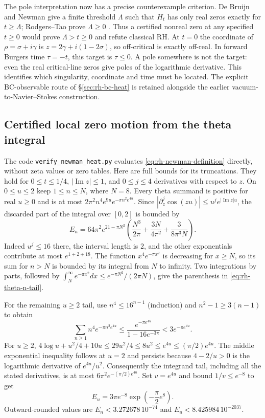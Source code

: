 The pole interpretation now has a precise counterexample criterion.
De Bruijn and Newman give a finite threshold $\Lambda$ such that
$H_t$ has only real zeros exactly for $t\ge\Lambda$;
Rodgers--Tao prove $\Lambda\ge0$
\cite[\S1]{rodgersTao2020}. Thus a certified nonreal zero at any
specified $t\ge0$ would prove $\Lambda>t\ge0$ and refute classical RH.
At $t=0$ the coordinate of $\rho=\sigma+i\gamma$ is
$z=2\gamma+i(1-2\sigma)$, so off-critical is exactly off-real.
In forward Burgers time $\tau=-t$, this target is $\tau\le0$.
A pole somewhere is not the target: even the real critical-line zeros
give poles of the logarithmic derivative. This identifies which
singularity, coordinate and time must be located. The explicit
BC-observable route of \S\ref{sec:rh-bc-heat} is retained alongside
the earlier vacuum-to-Navier--Stokes construction.

\subsection{Certified local zero motion from the theta integral}
\label{sec:rh-newman-certificates}

The code \texttt{verify\_newman\_heat.py} evaluates
\eqref{eq:rh-newman-definition} directly, without zeta values or zero
tables. Here are full bounds for its truncations. They hold for
$0\le t\le1/4$, $|\operatorname{Im}z|\le1$, and $0\le j\le4$
derivatives with respect to $z$. On $0\le u\le2$ keep $1\le n\le N$,
where $N=8$. Every theta summand is positive for real $u\ge0$ and is
at most $2\pi^2n^4e^{9u}e^{-\pi n^2e^{4u}}$. Since
$|\partial_z^j\cos(zu)|\le u^j e^{|\operatorname{Im}z|u}$, the
discarded part of the integral over $[0,2]$ is bounded by
\begin{equation}
 E_n=64\pi^2e^{21-\pi N^2}
 \left(\frac{N^3}{2\pi}+\frac{3N}{4\pi^2}
                  +\frac{3}{8\pi^3N}\right).
 \label{eq:rh-theta-n-tail}
\end{equation}
Indeed $u^j\le16$ there, the interval length is $2$, and the other
exponentials contribute at most $e^{1+2+18}$. The function
$x^4e^{-\pi x^2}$ is decreasing for $x\ge N$, so its sum for $n>N$
is bounded by its integral from $N$ to infinity. Two integrations by
parts, followed by
$\int_N^\infty e^{-\pi x^2}dx\le e^{-\pi N^2}/(2\pi N)$,
give the parenthesis in \eqref{eq:rh-theta-n-tail}.

For the remaining $u\ge2$ tail, use
$n^4\le16^{n-1}$ (induction) and
$n^2-1\ge3(n-1)$ to obtain
\[
 \sum_{n\ge1}n^4e^{-\pi n^2e^{4u}}
 \le\frac{e^{-\pi e^{4u}}}{1-16e^{-3\pi}}
 <3e^{-\pi e^{4u}}.
\]
For $u\ge2$,
$4\log u+u^2/4+10u\le29u^2/4\le8u^2\le e^{4u}
\le(\pi/2)e^{4u}$.
The middle exponential inequality follows at $u=2$ and persists
because $4-2/u>0$ is the logarithmic derivative of $e^{4u}/u^2$.
Consequently the integrand tail, including all the stated derivatives,
is at most $6\pi^2e^{-(\pi/2)e^{4u}}$.
Set $v=e^{4u}$ and bound $1/v\le e^{-8}$ to get
\begin{equation}
 E_u=3\pi e^{-8}\exp\left(-\frac\pi2e^8\right).
 \label{eq:rh-theta-u-tail}
\end{equation}
Outward-rounded values are $E_n<3.272678\,10^{-74}$ and
$E_u<8.425984\,10^{-2037}$.

